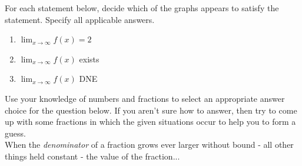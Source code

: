 \documentclass[10pt]{article}
\begin{document}
%
\hfill
%

For each statement below, decide which of the graphs appears to satisfy the statement. Specify all applicable answers.\\
\begin{enumerate}
\item[(a)] $\displaystyle\lim_{x\to\infty}f(x)=2$ \dotfill {}\\
\item[(b)] $\displaystyle\lim_{x\to\infty}f(x)$ exists \dotfill {}\\
\item[(c)] $\displaystyle\lim_{x\to\infty}f(x)$ DNE\dotfill  {}\\
\end{enumerate}

\lform   {} 


 Use your knowledge of numbers and fractions to select an appropriate answer choice for the question below. If you aren't sure how to answer, then try to come up with some fractions in which the given situations occur to help you to form a guess.\\

When the {\it denominator} of a fraction grows ever larger without bound - all other things held constant - the value of the fraction...\\
    
\end{document}
